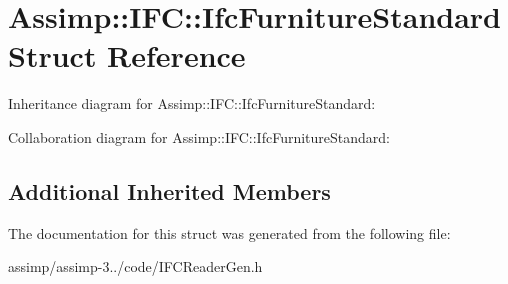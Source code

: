 \hypertarget{struct_assimp_1_1_i_f_c_1_1_ifc_furniture_standard}{\section{Assimp\+:\+:I\+F\+C\+:\+:Ifc\+Furniture\+Standard Struct Reference}
\label{struct_assimp_1_1_i_f_c_1_1_ifc_furniture_standard}
}


Inheritance diagram for Assimp\+:\+:I\+F\+C\+:\+:Ifc\+Furniture\+Standard\+:


Collaboration diagram for Assimp\+:\+:I\+F\+C\+:\+:Ifc\+Furniture\+Standard\+:
\subsection*{Additional Inherited Members}


The documentation for this struct was generated from the following file\+:\begin{DoxyCompactItemize}
\item 
assimp/assimp-\/3../code/I\+F\+C\+Reader\+Gen.\+h\end{DoxyCompactItemize}
